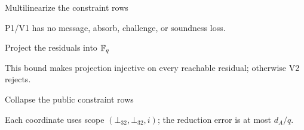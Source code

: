 \begin{pvstep}{Multilinearize the constraint rows}{%
}
\begin{pvexchange}
\end{pvexchange}
P1/V1 has no message, absorb, challenge, or soundness loss.
\end{pvstep}

\begin{pvstep}{Project the residuals into $\mathbb F_q$}{%
}
\begin{pvexchange}
\end{pvexchange}
This bound makes projection injective on every reachable residual; otherwise
V2 rejects.
\end{pvstep}

\begin{pvstep}{Collapse the public constraint rows}{%
}
\begin{pvexchange}
\end{pvexchange}
Each coordinate uses scope $(\bot_{32},\bot_{32},i)$; the reduction error is
at most $d_A/q$.
\end{pvstep}

